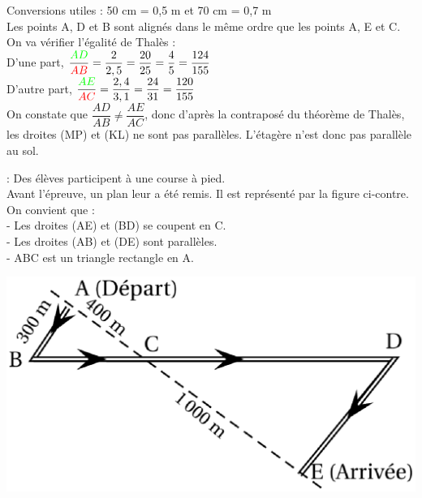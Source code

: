 \documentclass[a4paper,11pt]{article}
\newcounter{numexo}
\newcommand{\exo}[1]{\stepcounter{numexo}\noindent{\bf Exercice~\thenumexo} : \marginpar{\hfill /#1}}
\begin{document}
\color{red}
Conversions utiles : 50 cm = 0,5 m et 70 cm = 0,7 m\\

Les points A, D et B sont alignés dans le même ordre que les points A, E et C.\\

On va vérifier l'égalité de Thalès :\\

D'une part, $\dfrac{\textcolor{green}{AD}}{\textcolor{red}{AB}}=\dfrac{2}{2,5}=\dfrac{20}{25}=\dfrac{4}{5}=\dfrac{124}{155}$\\

D'autre part, $\dfrac{\textcolor{green}{AE}}{\textcolor{red}{AC}}=\dfrac{2,4}{3,1}=\dfrac{24}{31}=\dfrac{120}{155}$\\

On constate que $\dfrac{AD}{AB} \ne \dfrac{AE}{AC}$, donc d'après la contraposé du  théorème de Thalès, les droites (MP) et (KL) ne sont pas parallèles. L'étagère n'est donc pas parallèle au sol.\\

\color{black}

\newpage

\exo{6} 
Des élèves participent à une course à pied.\\
Avant l'épreuve, un plan leur a été remis.
Il est représenté par la figure ci-contre.\\
On convient que :\\
- Les droites (AE) et (BD) se coupent en C.\\
- Les droites (AB) et (DE) sont parallèles.\\
- ABC est un triangle rectangle en A.

\begin{center}
\includegraphics[scale=0.6]{thalesbrevet.eps} 
\end{center}
\end{document}
